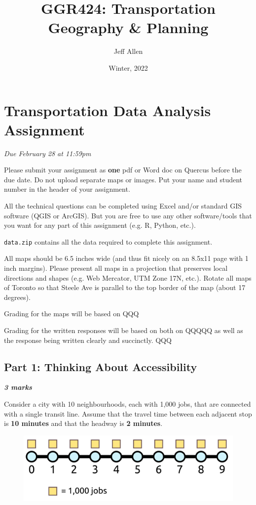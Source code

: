 \documentclass[11pt]{article}
\title{\textbf{GGR424: Transportation Geography \& Planning}}
\author{Jeff Allen}
\date{Winter, 2022}
\begin{document}
	\allsectionsfont{\sffamily}
	
	\section*{Transportation Data Analysis Assignment} 
		
	\textit{Due February 28 at 11:59pm}
	
	Please submit your assignment as \textbf{one} pdf or Word doc on Quercus before the due date. Do not upload separate maps or images. Put your name and student number in the header of your assignment.
	
	All the technical questions can be completed using Excel and/or standard GIS software (QGIS or ArcGIS). But you are free to use any other software/tools that you want for any part of this assignment (e.g. R, Python, etc.).
	
	\texttt{data.zip} contains all the data required to complete this assignment.
	
	All maps should be 6.5 inches wide (and thus fit nicely on an 8.5x11 page with 1 inch margins). Please present all maps in a projection that preserves local directions and shapes (e.g. Web Mercator, UTM Zone 17N, etc.). Rotate all maps of Toronto so that Steele Ave is parallel to the top border of the map (about 17 degrees).
	
	Grading for the maps will be based on QQQ
	
	Grading for the written responses will be based on both on QQQQQ as well as the response being written clearly and succinctly. QQQ
	
		
	\subsection*{Part 1: Thinking About Accessibility} 
	
	\vspace{-2mm}
	\textbf{\textit{3 marks}}
	
	Consider a city with 10 neighbourhoods, each with 1,000 jobs, that are connected with a single transit line. Assume that the travel time between each adjacent stop is \textbf{10 minutes} and that the headway is \textbf{2 minutes}. 
	
	\begin{figure}[h]
		\centering
		\includegraphics[width=0.5\linewidth]{images/city_plain.png}
	\end{figure}
\end{document}
